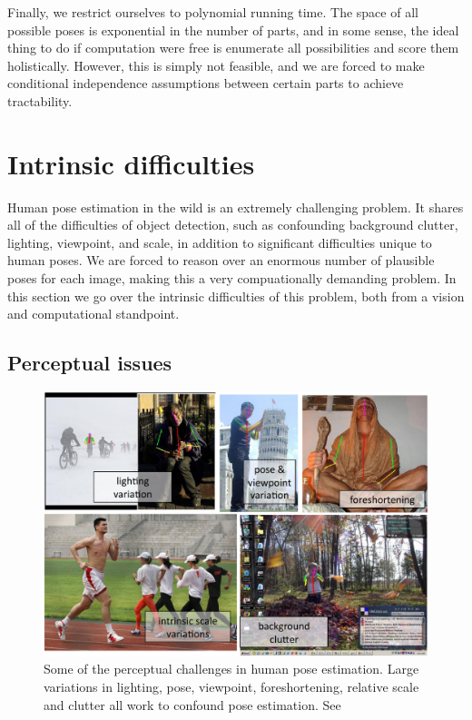 Finally, we restrict ourselves to polynomial running time.  The space of all 
possible poses is exponential in the number of parts, and in some sense, the 
ideal thing to do if computation were free is enumerate all possibilities and 
score them holistically.  However, this is simply not feasible, and we are 
forced to make conditional independence assumptions between certain parts to 
achieve tractability.

\section{Intrinsic difficulties}
Human pose estimation in the wild is an extremely challenging problem.  It 
shares all of the difficulties of object detection, such as confounding 
background clutter, lighting, viewpoint, and scale, in addition to
significant difficulties unique to human poses.  We are forced to reason over 
an enormous number of plausible poses for each image, making this a very 
compuationally demanding problem.  In this section we go over the intrinsic 
difficulties of this problem, both from a vision and computational standpoint.

\subsection{Perceptual issues}\label{sec:perceptual}
\begin{figure}[tb]
\begin{center}
\includegraphics[width=1.05\textwidth]{figs/perceptual-issues.pdf}
\caption[Perceptual difficulties in pose estimation]{Some of the perceptual 
challenges in human pose estimation.  Large variations in lighting, pose, 
viewpoint, foreshortening, relative scale and clutter all work to confound pose 
estimation.  See~}
\label{fig:perceptual-issues}
\end{center}
\end{figure}

